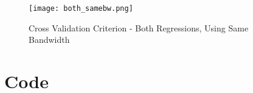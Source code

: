 \documentclass[]{report}
\newcommand{\0}{\bv{0}}
\newcommand{\1}{\bv{1}}
\begin{document}
\begin{enumerate}[1.]
\begin{enumerate}
\begin{figure}[hbtp]
	\begin{center}
		\caption{Cross Validation Criterion - Both Regressions, Using Same Bandwidth}
		\label{fig:reg_both_samebw}
		\texttt{[image: both\_samebw.png]}
	\end{center}
\end{figure}


\end{enumerate}
\end{enumerate}

\newpage
\section*{Code}
%
%
\end{document}
